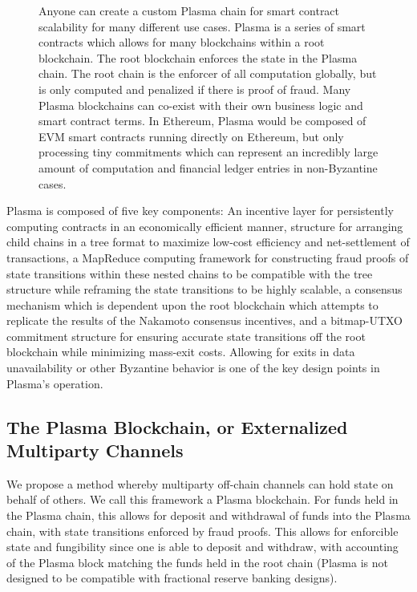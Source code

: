 \documentclass[letterpaper, 11pt]{article}
\begin{document}
\begin{figure}[H]
	\caption{
		Anyone can create a custom Plasma chain for smart contract
		scalability for many different use cases. Plasma is a series of
		smart contracts which allows for many blockchains within a root
		blockchain. The root blockchain enforces the state in the Plasma
		chain. The root chain is the enforcer of all computation
		globally, but is only computed and penalized if there is proof
		of fraud. Many Plasma blockchains can co-exist with their own
		business logic and smart contract terms. In Ethereum, Plasma
		would be composed of EVM smart contracts running directly on
		Ethereum, but only processing tiny commitments which can
		represent an incredibly large amount of computation and
		financial ledger entries in non-Byzantine cases.
		}
\end{figure}


Plasma is composed of five key components: An incentive layer for persistently
computing contracts in an economically efficient manner, structure for arranging
child chains in a tree format to maximize low-cost efficiency and net-settlement
of transactions, a MapReduce computing framework for constructing fraud proofs
of state transitions within these nested chains to be compatible with the tree
structure while reframing the state transitions to be highly scalable, a
consensus mechanism which is dependent upon the root blockchain which attempts
to replicate the results of the Nakamoto\cite{nakamoto} consensus incentives,
and a bitmap-UTXO commitment structure for ensuring accurate state
transitions off the root blockchain while minimizing mass-exit costs. Allowing
for exits in data unavailability or other Byzantine behavior is one of the key
design points in Plasma's operation.

\subsection{The Plasma Blockchain, or Externalized Multiparty Channels}

We propose a method whereby multiparty off-chain channels can hold state on
behalf of others. We call this framework a Plasma blockchain. For funds held in
the Plasma chain, this allows for deposit and withdrawal of funds into the
Plasma chain, with state transitions enforced by fraud proofs. This allows for
enforcible state and fungibility since one is able to deposit and withdraw, with
accounting of the Plasma block matching the funds held in the root chain (Plasma
is not designed to be compatible with fractional reserve banking designs).
\end{document}
